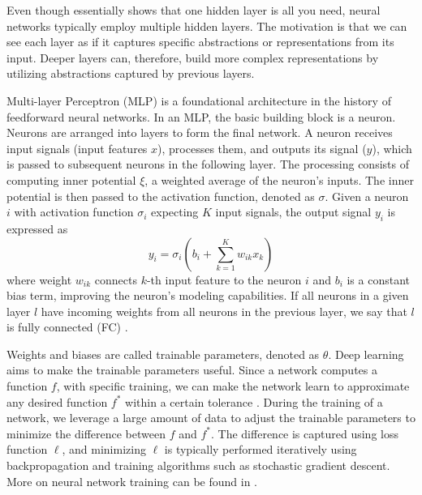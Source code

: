 Even though \cite{cybenko} essentially shows that one hidden layer is all you need, neural networks typically employ multiple hidden layers.
The motivation is that we can see each layer as if it captures specific abstractions or representations from its input.
Deeper layers can, therefore, build more complex representations by utilizing abstractions captured by previous layers.

Multi-layer Perceptron (MLP) is a foundational architecture in the history of feedforward neural networks.
In an MLP, the basic building block is a neuron.
Neurons are arranged into layers to form the final network.
A neuron receives input signals (input features $x$), processes them, and outputs its signal ($y$), which is passed to subsequent neurons in the following layer.
The processing consists of computing inner potential $\xi$, a weighted average of the neuron's inputs.
The inner potential is then passed to the activation function, denoted as $\sigma$. 
Given a neuron $i$ with activation function $\sigma_i$ expecting $K$ input signals, the output signal $y_i$ is expressed as
\begin{equation}
    y_i = \sigma_i(b_i + \sum_{k=1}^K w_{ik}x_k)
\end{equation}
where weight $w_{ik}$ connects $k$-th input feature to the neuron $i$ and $b_i$ is a constant bias term, improving the neuron's modeling capabilities.
If all neurons in a given layer $l$ have incoming weights from all neurons in the previous layer, we say that $l$ is fully connected (FC) \cite{goodfellow}.

Weights and biases are called trainable parameters, denoted as $\theta$.
Deep learning aims to make the trainable parameters useful.
Since a network computes a function $f$, with specific training, we can make the network learn to approximate any desired function $f^*$ within a certain tolerance \cite{cybenko}.
During the training of a network, we leverage a large amount of data to adjust the trainable parameters to minimize the difference between $f$ and $f^*$.
The difference is captured using loss function $\ell$, and minimizing $\ell$ is typically performed iteratively using backpropagation and training algorithms such as stochastic gradient descent.
More on neural network training can be found in \cite{goodfellow}.

